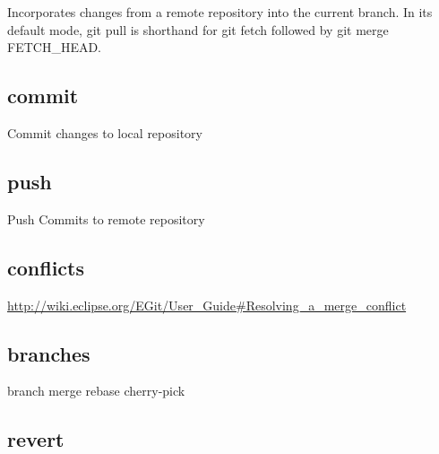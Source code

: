 \documentclass{scrreprt}
\newcommand{\layerThree}[1]{\subsection{#1}}
\begin{document}
Incorporates changes from a remote repository into the current branch. 
In its default mode, git pull is shorthand for git fetch followed by git merge FETCH_HEAD.

\layerThree{commit}

Commit changes to local repository

\layerThree{push}

Push Commits to remote repository

\layerThree{conflicts}

\url{http://wiki.eclipse.org/EGit/User_Guide#Resolving_a_merge_conflict}

\layerThree{branches}
branch
merge
rebase
cherry-pick

\layerThree{revert}



\nocite{*}

\clearpage
{}
{}


\end{document}
